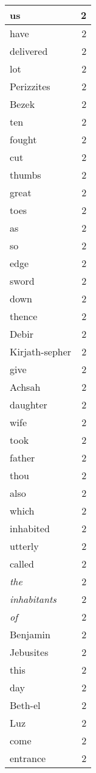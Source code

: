 \begin{center}
\begin{longtable}{l|r}
us & 2 \\ \hline
have & 2 \\ \hline
delivered & 2 \\ \hline
lot & 2 \\ \hline
Perizzites & 2 \\ \hline
Bezek & 2 \\ \hline
ten & 2 \\ \hline
fought & 2 \\ \hline
cut & 2 \\ \hline
thumbs & 2 \\ \hline
great & 2 \\ \hline
toes & 2 \\ \hline
as & 2 \\ \hline
so & 2 \\ \hline
edge & 2 \\ \hline
sword & 2 \\ \hline
down & 2 \\ \hline
thence & 2 \\ \hline
Debir & 2 \\ \hline
Kirjath-sepher & 2 \\ \hline
give & 2 \\ \hline
Achsah & 2 \\ \hline
daughter & 2 \\ \hline
wife & 2 \\ \hline
took & 2 \\ \hline
father & 2 \\ \hline
thou & 2 \\ \hline
also & 2 \\ \hline
which & 2 \\ \hline
inhabited & 2 \\ \hline
utterly & 2 \\ \hline
called & 2 \\ \hline
\emph{the} & 2 \\ \hline
\emph{inhabitants} & 2 \\ \hline
\emph{of} & 2 \\ \hline
Benjamin & 2 \\ \hline
Jebusites & 2 \\ \hline
this & 2 \\ \hline
day & 2 \\ \hline
Beth-el & 2 \\ \hline
Luz & 2 \\ \hline
come & 2 \\ \hline
entrance & 2 \\ \hline

\end{longtable}
\end{center}
